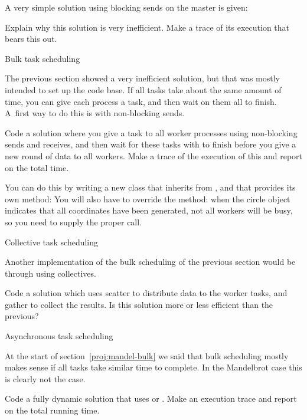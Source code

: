 A very simple solution using blocking sends on the master is given:

\begin{exercise}
  Explain why this solution is very inefficient. Make a trace of its
  execution that bears this out.
\end{exercise}

 {Bulk task scheduling}
\label{proj:mandel-bulk}

The previous section showed a very inefficient solution, but that was mostly
intended to set up the code base. If all tasks take about the same amount of time,
you can give each process a task, and then wait on them all to finish. A~first way
to do this is with non-blocking sends.

\begin{exercise}
  Code a  solution where you give a task to all worker processes
  using non-blocking sends and receives, and then wait for these tasks
  with 
  to finish before you give a new round of data to all workers.
  Make a trace of the execution of this and report on the total time.

  You can do this by writing a new class that inherits from ,
  and that provides its own  method:
  You will also have to override the  method: when the circle 
  object indicates that all coordinates have been generated, not all
  workers will be busy, so you need to supply the proper 
  call.
\end{exercise}

 {Collective task scheduling}
\label{proj:mandel-collective}

Another implementation of the bulk scheduling of the previous section
would be through using collectives.

\begin{exercise}
  Code a solution which uses scatter to distribute data to the worker
  tasks, and gather to collect the results. Is this solution more or
  less efficient than the previous?
\end{exercise}

 {Asynchronous task scheduling}

At the start of section~\ref{proj:mandel-bulk} we said that bulk scheduling
mostly makes sense if all tasks take similar time to complete.
In the Mandelbrot case this is clearly not the case.

\begin{exercise}
  Code a fully dynamic solution that uses  or .
  Make an execution trace and report on the total running time.
\end{exercise}

